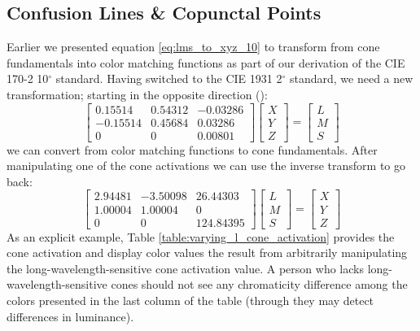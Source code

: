 \documentclass[twocolumn]{article}
\begin{document}
\subsection{Confusion Lines \& Copunctal Points}
Earlier we presented equation \ref{eq:lms_to_xyz_10} to transform from cone fundamentals into color matching functions as part of our derivation of the CIE 170-2 10$^\circ$ standard.  Having switched to the CIE 1931 2$^\circ$ standard, we need a new transformation; starting in the opposite direction (\cite{smith1975spectral}):
\begin{equation}
    \begin{bmatrix}
        0.15514&0.54312&-0.03286\\
        -0.15514&0.45684&0.03286\\
        0&0&0.00801
    \end{bmatrix}\begin{bmatrix}
        X\\
        Y\\
        Z
    \end{bmatrix}=\begin{bmatrix}
        L\\
        M\\
        S
    \end{bmatrix}
\end{equation}
we can convert from color matching functions to cone fundamentals.  After manipulating one of the cone activations we can use the inverse transform to go back:
\begin{equation}
    \begin{bmatrix}
        2.94481&-3.50098&26.44303\\
        1.00004&1.00004&0\\
        0&0&124.84395
    \end{bmatrix}\begin{bmatrix}
        L\\
        M\\
        S
    \end{bmatrix}=\begin{bmatrix}
        X\\
        Y\\
        Z
    \end{bmatrix}
\end{equation}
As an explicit example, Table \ref{table:varying_l_cone_activation} provides the cone activation and display color values the result from arbitrarily manipulating the long-wavelength-sensitive cone activation value.  A person who lacks long-wavelength-sensitive cones should not see any chromaticity difference among the colors presented in the last column of the table (through they may detect differences in luminance).
\end{document}
